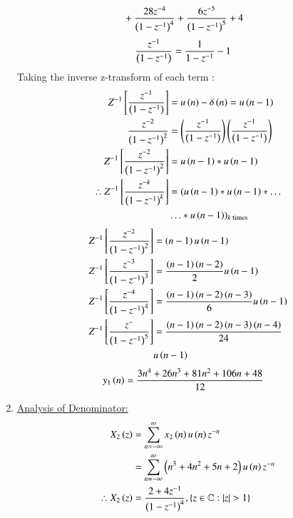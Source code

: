 \documentclass[journal,12pt,twocolumn]{IEEEtran}
\theoremstyle{remark}
\begin{document}
\begin{enumerate}[label=\arabic*.]
\begin{align}
    &+ \frac{28z^{-4}}{\left(1-z^{-1}\right)^4}+\frac{6z^{-5}}{\left(1-z^{-1}\right)^5}+4 \notag 
\end{align}
\begin{align}
    \frac{z^{-1}}{\left(1-z^{-1}\right)} &= \frac{1}{1-z^{-1}} -1
\end{align}
Taking the inverse z-transform of each term : 
\begin{align}
    Z^{-1}\left[\frac{z^{-1}}{\left(1-z^{-1}\right)}\right] &= u\left(n\right)-\delta\left(n\right)= u\left(n-1\right)\\
    \frac{z^{-2}}{\left(1-z^{-1}\right)^2}&= \left(\frac{z^{-1}}{\left(1-z^{-1}\right)}\right)\left(\frac{z^{-1}}{\left(1-z^{-1}\right)}\right)\\
    Z^{-1}\left[\frac{z^{-2}}{\left(1-z^{-1}\right)^2}\right]&= u\left(n-1\right)*u\left(n-1\right)\\
    \therefore  Z^{-1}\left[\frac{z^{-k}}{\left(1-z^{-1}\right)^k}\right]&=(u\left(n-1\right) * u\left(n-1\right) * \ldots\\ &\ldots *u\left(n-1\right))_{k \text{ times}} \label{eq:11.9.5.26.3}\notag 
\end{align}
\begin{align}
     Z^{-1}\left[\frac{z^{-2}}{\left(1-z^{-1}\right)^2}\right]&=\left(n-1\right)u\left(n-1\right) \\
     Z^{-1}\left[\frac{z^{-3}}{\left(1-z^{-1}\right)^3}\right]&=\frac{\left(n-1\right)\left(n-2\right)}{2}u\left(n-1\right) \\
     Z^{-1}\left[\frac{z^{-4}}{\left(1-z^{-1}\right)^4}\right]&=\frac{\left(n-1\right)\left(n-2\right)\left(n-3\right)}{6}u\left(n-1\right) \\
          Z^{-1}\left[\frac{z^{-}}{\left(1-z^{-1}\right)^5}\right]&=\frac{\left(n-1\right)\left(n-2\right)\left(n-3\right)\left(n-4\right)}{24}\\&u\left(n-1\right)\notag  
\end{align}
\begin{align}
    y_1\left(n\right) &= \frac{3n^4 + 26n^3 + 81n^2 + 106n + 48}{12}
\end{align}
\item \underline{Analysis of Denominator:}
\begin{align}
    X_2\left(z\right) &= \sum_{n=-\infty}^\infty x_2\left(n\right) u\left(n\right) z^{-n}\\
                &= \sum_{n=-\infty}^\infty \left(n^{3}+4n^{2}+5n+2\right) u\left(n\right) z^{-n}\\
   \therefore  X_2\left(z\right) &= \frac{2+4z^{-1}}{\left(1-z^{-1}\right)^4},\left\{z\in\mathbb{C} : \lvert z \rvert > 1\right\}   \\
\end{align}

\end{enumerate}
\end{document}
